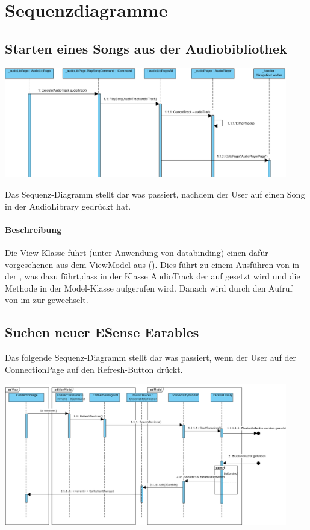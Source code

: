 \documentclass[../entwurf.tex]{subfiles}
\begin{document}
\section{Sequenzdiagramme}
\subsection{Starten eines Songs aus der Audiobibliothek}
\begin{center}
	\includegraphics[page=1,width=350pt,keepaspectratio]{../graphics/sequenz_diagramme/PlaySongSequenzDia.png}
\end{center}
Das Sequenz-Diagramm stellt dar was passiert, nachdem der User auf einen Song in der AudioLibrary gedrückt hat.
\paragraph{Beschreibung}
Die View-Klasse  führt (unter Anwendung von \Gls{databinding}) einen dafür vorgesehenen  aus dem ViewModel aus ().
Dies führt zu einem Ausführen von  in der ,
was dazu führt,dass in der Klasse AudioTrack der  auf  gesetzt wird   und die Methode  in der Model-Klasse  aufgerufen wird. Danach wird durch den Aufruf von  im  zur  gewechselt.

\subsection{Suchen neuer ESense Earables}
Das folgende Sequenz-Diagramm stellt dar was passiert, wenn der User auf der ConnectionPage auf den Refresh-Button drückt.
\begin{center}
	\includegraphics[page=1,width=350pt,keepaspectratio]{../graphics/sequenz_diagramme/RefreshFoundDevices.png}
\end{center}
\end{document}

